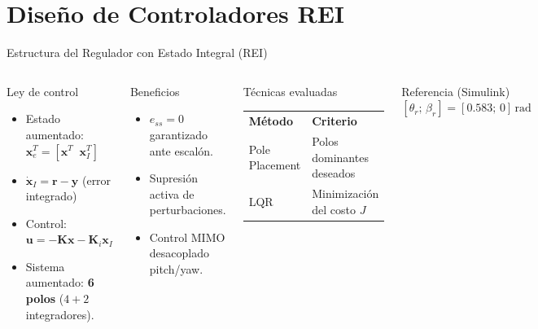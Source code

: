 \documentclass[mathserif,spanish,10pt]{beamer}
\begin{document}
\section{Diseño de Controladores REI}

\begin{frame}{Estructura del Regulador con Estado Integral (REI)}
\begin{columns}[T]
  \begin{block}{Ley de control}
    \begin{itemize}
      \item Estado aumentado: $\mathbf{x}_e^T = [\mathbf{x}^T\;\; \mathbf{x}_I^T]$
      \item $\dot{\mathbf{x}}_I = \mathbf{r} - \mathbf{y}$ \quad (error integrado)
      \item Control: $\mathbf{u} = -\mathbf{K}\mathbf{x} - \mathbf{K}_i\mathbf{x}_I$
      \item Sistema aumentado: \textbf{6 polos} ($4+2$ integradores).
    \end{itemize}
  \end{block}
  \begin{block}{Beneficios}
    \scriptsize
    \begin{itemize}
      \item $e_{ss}=0$ garantizado ante escalón.
      \item Supresión activa de perturbaciones.
      \item Control MIMO desacoplado pitch/yaw.
    \end{itemize}
  \end{block}

  \begin{block}{Técnicas evaluadas}
    \centering\small
    \vspace{4pt}
    \begin{tabular}{p{1.5cm}p{2.2cm}}
      \rowcolor{rowhdr}
      \color{white}\textbf{Método} & \color{white}\textbf{Criterio} \\
      Pole Placement & Polos dominantes deseados \\
      LQR & Minimización del costo $J$ \\
    \end{tabular}
    \vspace{6pt}
  \end{block}
  \begin{alertblock}{Referencia (Simulink)}
    \centering
    $[\theta_r;\,\beta_r]=[0.583;\,0]\,\text{rad}$
  \end{alertblock}
\end{columns}
\end{frame}
\end{document}
